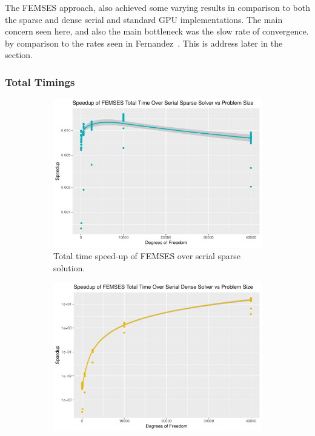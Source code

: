 The FEMSES approach, also achieved some varying results in comparison to both the sparse and dense serial and standard GPU implementations. The main concern seen here, and also the main bottleneck was the slow rate of convergence. by comparison to the rates seen in Fernandez~\cite{femses}. This is address later in the section.

\subsubsection{Total Timings}

\begin{figure}
	\centering
	\begin{subfigure}{0.48\linewidth}
		\centering
		\includegraphics[width = \linewidth]{Plots/total_femses_cpu_sparse_speedup_vs_n}
		\caption{Total time speed-up of FEMSES over serial sparse solution.}
		\label{fig:tot_femses_sparse}
	\end{subfigure}\hfill
	\begin{subfigure}{0.48\linewidth}
		\centering
		\includegraphics[width=\linewidth]{Plots/total_femses_cpu_dense_speedup_vs_n}

\end{subfigure}
\end{figure}
